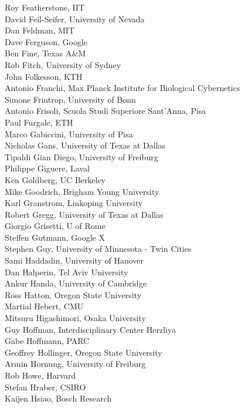 \begin{multicols}{3}
{Roy Featherstone, IIT\\
David Feil-Seifer, University of Nevada\\
Dan Feldman, MIT\\
Dave Ferguson, Google\\
Ben Fine, Texas A\&M\\
Rob Fitch, University of Sydney\\
John Folkesson, KTH\\
Antonio Franchi, Max Planck Institute for Biological Cybernetics\\
Simone Frintrop, University of Bonn\\
Antonio Frisoli, Scuola Studi Superiore Sant'Anna, Pisa\\
Paul Furgale, ETH\\
Marco Gabiccini, University of Pisa\\
Nicholas Gans, University of Texas at Dallas\\
Tipaldi Gian Diego, University of Freiburg\\
Philippe Giguere, Laval\\
Ken Goldberg, UC Berkeley\\
Mike Goodrich, Brigham Young University\\
Karl Granstrom, Linkoping University\\
Robert Gregg, University of Texas at Dallas\\
Giorgio Grisetti, U of Rome\\
Steffen Gutmann, Google X\\
Stephen Guy, University of Minnesota - Twin Cities\\
Sami Haddadin, University of Hanover\\
Dan Halperin, Tel Aviv University\\
Ankur Handa, University of Cambridge\\
Ross Hatton, Oregon State University\\
Martial Hebert, CMU\\
Mitsuru Higashimori, Osaka University\\
Guy Hoffman, Interdisciplinary Center Herzliya\\
Gabe Hoffmann, PARC\\
Geoffrey Hollinger, Oregon State University\\
Armin Hornung, University of Freiburg\\
Rob Howe, Harvard\\
Stefan Hraber, CSIRO\\
Kaijen Hsiao, Bosch Research\\
}
\end{multicols}

